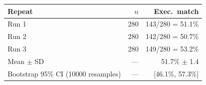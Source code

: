\begin{tabular}{lrr}
\toprule
Repeat & $n$ & Exec.\ match \\
\midrule
Run 1 & 280 & 143/280 = 51.1\% \\
Run 2 & 280 & 142/280 = 50.7\% \\
Run 3 & 280 & 149/280 = 53.2\% \\
\midrule
Mean $\pm$ SD & --- & 51.7\% $\pm$ 1.4 \\
Bootstrap 95\% CI (10000 resamples) & --- & [46.1\%, 57.3\%] \\
\bottomrule
\end{tabular}
